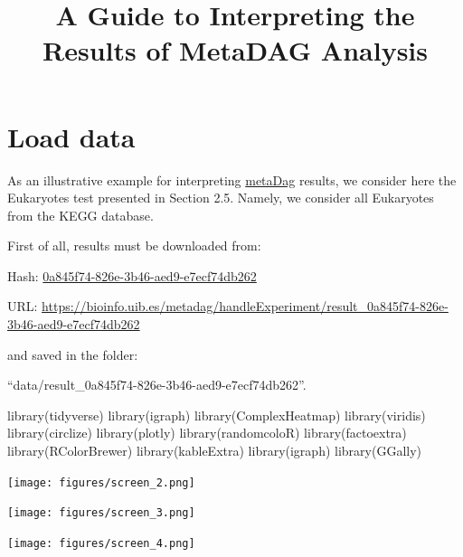 \documentclass[
  letterpaper,
  DIV=11,
  numbers=noendperiod]{scrreprt}
\title{A Guide to Interpreting the Results of MetaDAG Analysis}
\author{}
\date{}
\newenvironment{Shaded}{}{}
\newcommand{\FunctionTok}[1]{\textcolor[rgb]{0.38,0.69,0.94}{#1}}
\newcommand{\NormalTok}[1]{\textcolor[rgb]{0.67,0.70,0.75}{#1}}
\renewcommand*\contentsname{Table of contents}
\newcommand\contentsname{Table of contents}
\begin{document}
\maketitle
\renewcommand*\contentsname{Table of contents}
{
\hypersetup{linkcolor=blue}
\setcounter{tocdepth}{2}
\tableofcontents
}

\hypertarget{load-data}{%
\chapter{Load data}\label{load-data}}

As an illustrative example for interpreting
\href{https://bioinfo.uib.es/metadag/}{metaDag} results, we consider
here the Eukaryotes test presented in Section 2.5. Namely, we consider
all Eukaryotes from the KEGG database.

First of all, results must be downloaded from:

Hash:
\href{https://bioinfo.uib.es/metadag/handleExperiment/result_0a845f74-826e-3b46-aed9-e7ecf74db262}{0a845f74-826e-3b46-aed9-e7ecf74db262}

URL:
\url{https://bioinfo.uib.es/metadag/handleExperiment/result_0a845f74-826e-3b46-aed9-e7ecf74db262}

and saved in the folder:

``data/result\_0a845f74-826e-3b46-aed9-e7ecf74db262''.

\begin{Shaded}
\begin{Highlighting}[]
\FunctionTok{library}\NormalTok{(tidyverse)}
\FunctionTok{library}\NormalTok{(igraph)}
\FunctionTok{library}\NormalTok{(ComplexHeatmap)}
\FunctionTok{library}\NormalTok{(viridis)}
\FunctionTok{library}\NormalTok{(circlize)}
\FunctionTok{library}\NormalTok{(plotly)}
\FunctionTok{library}\NormalTok{(randomcoloR)}
\FunctionTok{library}\NormalTok{(factoextra)}
\FunctionTok{library}\NormalTok{(RColorBrewer)}
\FunctionTok{library}\NormalTok{(kableExtra)}
\FunctionTok{library}\NormalTok{(igraph)}
\FunctionTok{library}\NormalTok{(GGally)}
\end{Highlighting}
\end{Shaded}

\texttt{[image: figures/screen\_2.png]}

\texttt{[image: figures/screen\_3.png]}

\texttt{[image: figures/screen\_4.png]}
\end{document}
